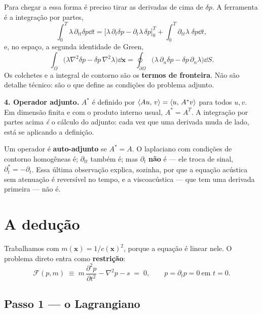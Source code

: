 \documentclass[11pt,a4paper,oneside]{report}
\begin{document}
\begin{matematica}
Para chegar a essa forma \'e preciso tirar as derivadas de cima de $\delta p$.
A ferramenta \'e a integra\c{c}\~ao por partes,
\[
\int_0^T \lambda\,\partial_{tt}\delta p \dd t
 = \bigl[\lambda\,\partial_t\delta p - \partial_t\lambda\,\delta p\bigr]_0^T
 + \int_0^T \partial_{tt}\lambda\;\delta p \dd t ,
\]
e, no espa\c{c}o, a segunda identidade de Green,
\[
\int_\Omega \bigl(\lambda\nabla^{2}\delta p
 - \delta p\,\nabla^{2}\lambda\bigr)\dd\mathbf{x}
 = \oint_{\partial\Omega}\bigl(\lambda\,\partial_n\delta p
 - \delta p\,\partial_n\lambda\bigr)\dd S .
\]
Os colchetes e a integral de contorno s\~ao os \textbf{termos de fronteira}.
N\~ao s\~ao detalhe t\'ecnico: s\~ao o que define as condi\c{c}\~oes do
problema adjunto.

\medskip
\textbf{4. Operador adjunto.} $A^{*}$ \'e definido por
$\langle Au,\,v\rangle = \langle u,\,A^{*}v\rangle$ para todos $u,v$. Em dimens\~ao finita e
com o produto interno usual, $A^{*} = A^{T}$. A integra\c{c}\~ao por partes
acima \emph{\'e} o c\'alculo do adjunto: cada vez que uma derivada muda de
lado, est\'a se aplicando a defini\c{c}\~ao.

Um operador \'e \textbf{auto-adjunto} se $A^{*} = A$. O laplaciano com
condi\c{c}\~oes de contorno homog\^eneas \'e; $\partial_{tt}$ tamb\'em \'e; mas
$\partial_t$ \textbf{n\~ao} \'e --- ele troca de sinal,
$\partial_t^{*} = -\partial_t$. Essa \'ultima observa\c{c}\~ao explica,
sozinha, por que a equa\c{c}\~ao ac\'ustica sem atenua\c{c}\~ao \'e
revers\'ivel no tempo, e a viscoac\'ustica --- que tem uma derivada primeira
--- n\~ao \'e.
\end{matematica}

\section{A dedu\c{c}\~ao}
\label{sec:formulacao-grad}

Trabalhamos com $m(\mathbf{x}) = 1/c(\mathbf{x})^{2}$, porque a equa\c{c}\~ao
\'e linear nele. O problema direto entra como \textbf{restri\c{c}\~ao}:
\begin{equation}
\mathcal{F}(p,m) \;\equiv\; m\,\frac{\partial^{2}p}{\partial t^{2}}
 - \nabla^{2}p - s \;=\; 0 ,
\qquad p = \partial_t p = 0 \ \text{em } t=0 .
\end{equation}

\subsection*{Passo 1 --- o Lagrangiano}
\end{document}
